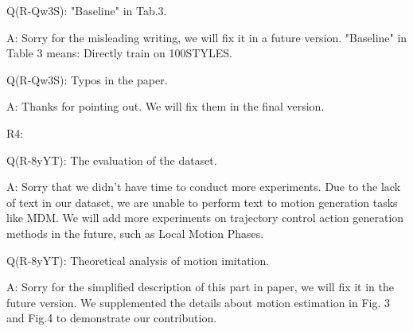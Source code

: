 \documentclass{article}
\begin{document}
Q(R-Qw3S): "Baseline" in Tab.3.

A: Sorry for the misleading writing, we will fix it in a future version. "Baseline" in Table 3 means: Directly train on 100STYLES.


Q(R-Qw3S): Typos in the paper.

A: Thanks for pointing out. We will fix them in the final version.



R4:


Q(R-8yYT): The evaluation of the dataset.

A: Sorry that we didn't have time to conduct more experiments. Due to the lack of text in our dataset, we are unable to perform text to motion generation tasks like MDM. We will add more experiments on trajectory control action generation methods in the future, such as
Local Motion Phases.

Q(R-8yYT): Theoretical analysis of motion imitation.

A: Sorry for the simplified description of this part in paper, we will fix it in the future version. We supplemented the details about motion estimation in Fig. 3 and Fig.4 to demonstrate our contribution.
\end{document}
